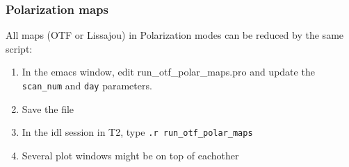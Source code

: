 \documentclass[a4paper,10pt]{article}
\begin{document}
\subsubsection{Polarization maps}

All maps (OTF or Lissajou) in Polarization modes can be reduced by the same script:
\begin{enumerate}
\item In the emacs window, edit run\_otf\_polar\_maps.pro and update the {\tt scan\_num}
  and {\tt day} parameters.
\item Save the file
\item In the idl session in T2, type {\tt .r run\_otf\_polar\_maps}
\item Several plot windows might be on top of eachother
\end{enumerate}


\end{document}
